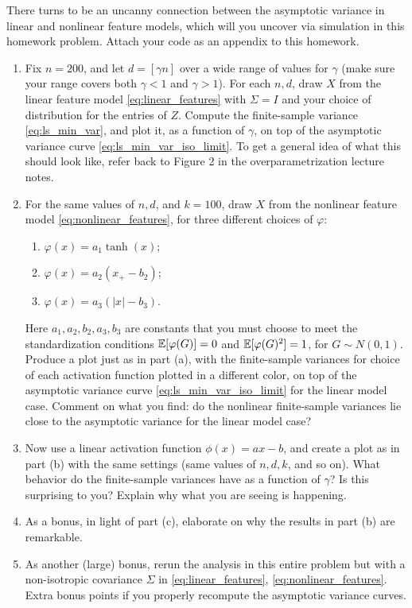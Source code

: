 \documentclass{article}
\begin{document}
There turns to be an uncanny connection between the asymptotic variance in
linear and nonlinear feature models, which will you uncover via simulation in
this homework problem. Attach your code as an appendix to this homework. 

\begin{enumerate}[label=(\alph*)]
\item Fix $n=200$, and let $d=[\gamma n]$ over a wide range of values for
  $\gamma$ (make sure your range covers both $\gamma<1$ and $\gamma>1$). For
  each $n,d$, draw $X$ from the linear feature model \eqref{eq:linear_features}
  with $\Sigma=I$ and your choice of distribution for the entries of
  $Z$. Compute the finite-sample variance \eqref{eq:ls_min_var}, and plot it, as
  a function of $\gamma$, on top of the asymptotic variance curve  
  \eqref{eq:ls_min_var_iso_limit}. To get a general idea of what this should
  look like, refer back to Figure 2 in the overparametrization lecture notes.     
  \marginpar{\small [3 pts]}

\item For the same values of $n,d$, and $k=100$, draw $X$ from the nonlinear
  feature model \eqref{eq:nonlinear_features}, for three different choices of
  $\varphi$:   
  \begin{enumerate}[label=\roman*.]
  \item $\varphi(x) = a_1\tanh(x)$;
  \item $\varphi(x) = a_2(x_+-b_2)$;
  \item $\varphi(x) = a_3(|x|-b_3)$.
  \end{enumerate}
  Here $a_1,a_2,b_2,a_3,b_3$ are constants that you must choose to meet the 
  standardization conditions $\mathbb{E}[\varphi(G)]=0$ and $\mathbb{E}[\varphi(G)^2]=1$, for 
  $G \sim N(0,1)$. Produce a plot just as in part (a), with the finite-sample
  variances for choice of each activation function plotted in a different color,
  on top of the asymptotic variance curve \eqref{eq:ls_min_var_iso_limit} for
  the linear model case. Comment on what you find: do the nonlinear
  finite-sample variances lie close to the asymptotic variance for the linear
  model case?  
  \marginpar{\small [9 pts]}

\item Now use a linear activation function $\phi(x) = ax-b$, and create a plot
  as in part (b) with the same settings (same values of $n,d,k$, and so
  on). What behavior do the finite-sample variances have as a function of 
  $\gamma$? Is this surprising to you? Explain why what you are seeing is
  happening. 
 \marginpar{\small [3 pts]}

\item As a bonus, in light of part (c), elaborate on why the results in part (b)
  are remarkable. 

\item As another (large) bonus, rerun the analysis in this entire problem but
  with a non-isotropic covariance $\Sigma$ in \eqref{eq:linear_features},
  \eqref{eq:nonlinear_features}. Extra bonus points if you properly recompute
  the asymptotic variance curves. 
\end{enumerate}





\end{document}

